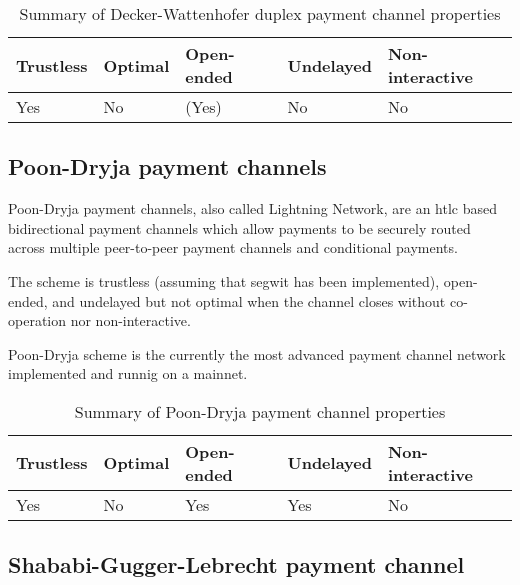 \documentclass{llncs}
\begin{document}

\begin{table}[ht]
  \begin{tabularx}{\textwidth}{ | X | l | l | l | X |}
  \hline
  Trustless & Optimal & Open-ended & Undelayed & Non-interactive \\
  \hline \hline
  Yes & No & (Yes) & No & No \\
  \hline
  \end{tabularx}
  \caption{Summary of Decker-Wattenhofer duplex payment channel properties}
  \label{fig:summaryDeckerWattenhoferPaymentChannel}
\end{table}

\subsection{Poon-Dryja payment channels}

Poon-Dryja payment channels, also called Lightning Network, are an \gls{htlc} based bidirectional payment channels which allow payments to be securely routed across multiple peer-to-peer payment channels \cite{poon2016bitcoin} and conditional payments.

The scheme is trustless (assuming that \gls{segwit} has been implemented), open-ended, and undelayed but not optimal when the channel closes without co-operation nor non-interactive.

Poon-Dryja scheme is the currently the most advanced payment channel network implemented and runnig on a mainnet.

\begin{table}[ht]
  \begin{tabularx}{\textwidth}{ | X | l | l | l | X |}
  \hline
  Trustless & Optimal & Open-ended & Undelayed & Non-interactive \\
  \hline \hline
  Yes & No & Yes & Yes & No \\
  \hline
  \end{tabularx}
  \caption{Summary of Poon-Dryja payment channel properties}
  \label{fig:summaryPoonDryjaPaymentChannel}
\end{table}

\subsection{Shababi-Gugger-Lebrecht payment channel}
\end{document}
